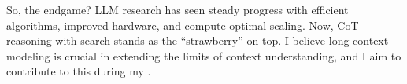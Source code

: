 So, the endgame?
%
LLM research has seen steady progress with efficient algorithms, improved hardware, and compute-optimal scaling.
%
Now, CoT reasoning with search stands as the ``strawberry'' on top.
%
I believe long-context modeling is crucial in extending the limits of context understanding, and I aim to contribute to this during my \thedegree.
